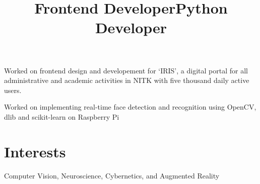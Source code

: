 \documentclass[margin]{res}
\begin{document}
\begin{resume}
      \title{\textbf{Frontend Developer}}
      \begin{position}
        Worked on frontend design and developement for `IRIS', a digital portal for all administrative and academic activities in NITK with five thousand daily active users.
      \end{position}

      \title{\textbf{Python Developer}}
      \begin{position}
        Worked on implementing real-time face detection and recognition using OpenCV, dlib and scikit-learn on Raspberry Pi
      \end{position}


    \section{Interests}
      Computer Vision, Neuroscience, Cybernetics, and Augmented Reality

  \end{resume}
\end{document}
